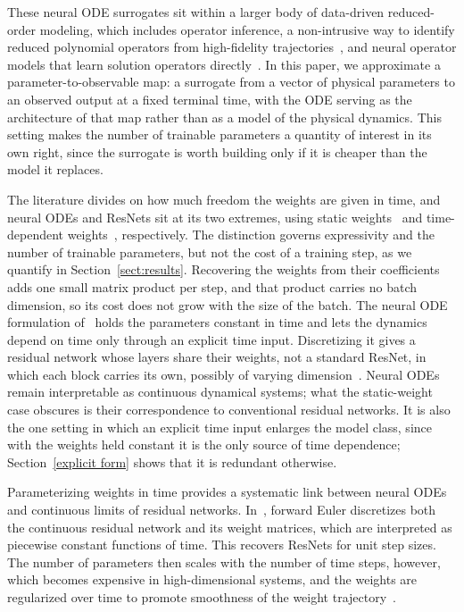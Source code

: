 \documentclass[pdflatex,sn-mathphys-num]{sn-jnl}%
\theoremstyle{thmstyleone}%
\theoremstyle{thmstyletwo}%
\theoremstyle{thmstylethree}%
\begin{document}
These neural ODE surrogates sit within a larger body of data-driven reduced-order modeling, which includes operator inference, a non-intrusive way to identify reduced polynomial operators from high-fidelity trajectories~\cite{peherstorfer2016dataOpInf, benner2025applicationoperatorinferencereducedorder, kramer2024learning}, and neural operator models that learn solution operators directly~\cite{deepOnet, li2020neuraloperatorgraphkernel, li2021fourierneuraloperatorparametric}.
%
In this paper, we approximate a parameter-to-observable map: a surrogate from a vector of physical parameters to an observed output at a fixed terminal time, with the ODE serving as the architecture of that map rather than as a model of the physical dynamics.
%
This setting makes the number of trainable parameters a quantity of interest in its own right, since the surrogate is worth building only if it is cheaper than the model it replaces.

The literature divides on how much freedom the weights are given in time, and neural ODEs and ResNets sit at its two extremes, using static weights~\cite{ChenEtAl2018, ott2021resnet} and time-dependent weights~\cite{gunther, generalized, autonomous, dissect}, respectively.
%
The distinction governs expressivity and the number of trainable parameters, but not the cost of a training step, as we quantify in Section~\ref{sect:results}.
%
Recovering the weights from their coefficients adds one small matrix product per step, and that product carries no batch dimension, so its cost does not grow with the size of the batch.
%
The neural ODE formulation of~\cite{ChenEtAl2018} holds the parameters constant in time and lets the dynamics depend on time only through an explicit time input.
%
Discretizing it gives a residual network whose layers share their weights, not a standard ResNet, in which each block carries its own, possibly of varying dimension~\cite{dissect, autonomous, ott2021resnet, sander2022residual, heEtAl}.
%
Neural ODEs remain interpretable as continuous dynamical systems; what the static-weight case obscures is their correspondence to conventional residual networks.
%
It is also the one setting in which an explicit time input enlarges the model class, since with the weights held constant it is the only source of time dependence; Section~\ref{explicit form} shows that it is redundant otherwise.

Parameterizing weights in time provides a systematic link between neural ODEs and continuous limits of residual networks.
%
In~\cite{HaberRuthotto2017}, forward Euler discretizes both the continuous residual network and its weight matrices, which are interpreted as piecewise constant functions of time.
%
This recovers ResNets for unit step sizes.
%
The number of parameters then scales with the number of time steps, however, which becomes expensive in high-dimensional systems, and the weights are regularized over time to promote smoothness of the weight trajectory~\cite{HaberRuthotto2017, dissect}.
\end{document}
